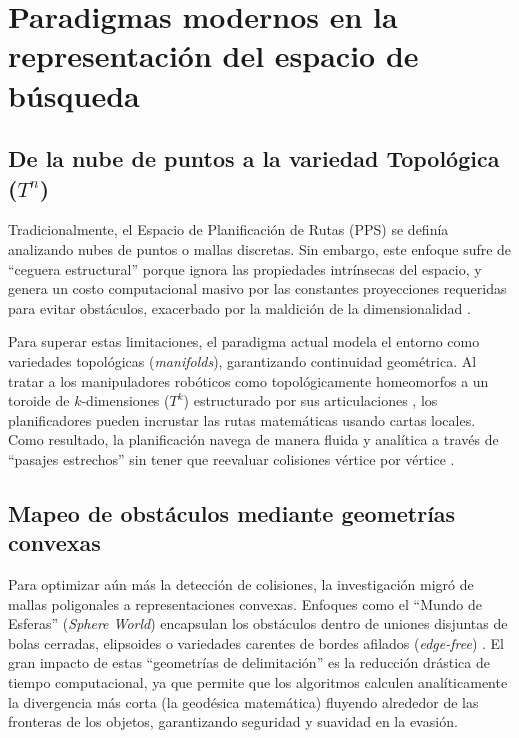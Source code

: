 \section{Paradigmas modernos en la representación del espacio de búsqueda}

\subsection{De la nube de puntos a la variedad Topológica ($T^n$)}
Tradicionalmente, el Espacio de Planificación de Rutas (PPS) se definía analizando 
nubes de puntos o mallas discretas. Sin embargo, este enfoque sufre de 
\enquote{ceguera estructural} porque ignora las propiedades intrínsecas 
del espacio, y genera un costo computacional masivo por las constantes 
proyecciones requeridas para evitar obstáculos, exacerbado por la maldición 
de la dimensionalidad \parencite{radhakrishnan2024state, semwal2024manipulator}.

Para superar estas limitaciones, el paradigma actual modela el entorno como 
variedades topológicas (\textit{manifolds}), garantizando continuidad geométrica. 
Al tratar a los manipuladores robóticos como topológicamente homeomorfos a un 
toroide de $k$-dimensiones ($T^k$) estructurado por sus articulaciones 
\parencite{pierce2025constrained}, los planificadores pueden incrustar las 
rutas matemáticas usando cartas locales. Como resultado, la planificación 
navega de manera fluida y analítica a través de \enquote{pasajes estrechos} 
sin tener que reevaluar colisiones vértice por vértice \parencite{radhakrishnan2024state}.

\subsection{Mapeo de obstáculos mediante geometrías convexas}
Para optimizar aún más la detección de colisiones, la investigación 
migró de mallas poligonales a representaciones convexas. Enfoques como el 
\enquote{Mundo de Esferas} (\textit{Sphere World}) encapsulan los obstáculos 
dentro de uniones disjuntas de bolas cerradas, elipsoides o variedades carentes 
de bordes afilados (\textit{edge-free}) \parencite{radhakrishnan2024state}. El 
gran impacto de estas \enquote{geometrías de delimitación} es la reducción drástica 
de tiempo computacional, ya que permite que los algoritmos calculen analíticamente 
la divergencia más corta (la geodésica matemática) fluyendo alrededor de las 
fronteras de los objetos, garantizando seguridad y suavidad en la evasión.




